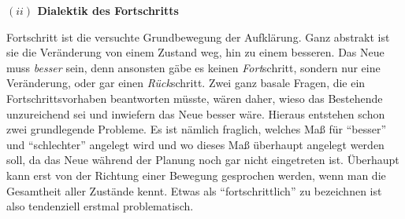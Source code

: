 \documentclass[a4paper, 12pt]{article}
\begin{document}
\begin{onehalfspace}
\vspace{5mm}
\noindent\textbf{$(ii)$ Dialektik des Fortschritts}

\noindent Fortschritt ist die versuchte Grundbewegung der Aufklärung. Ganz abstrakt ist sie die Veränderung von einem Zustand weg, hin zu einem besseren. Das Neue muss \emph{besser} sein, denn ansonsten gäbe es keinen \emph{Fort}schritt, sondern nur eine Veränderung, oder gar einen \emph{Rück}schritt. Zwei ganz basale Fragen, die ein Fortschrittsvorhaben beantworten müsste, wären daher, wieso das Bestehende unzureichend sei und inwiefern das Neue besser wäre. Hieraus entstehen schon zwei grundlegende Probleme. Es ist nämlich fraglich, welches Maß für "`besser"' und "`schlechter"' angelegt wird und wo dieses Maß überhaupt angelegt werden soll, da das Neue während der Planung noch gar nicht eingetreten ist. Überhaupt kann erst von der Richtung einer Bewegung gesprochen werden, wenn man die Gesamtheit aller Zustände kennt. Etwas als "`fortschrittlich"' zu bezeichnen ist also tendenziell erstmal problematisch. 


\end{onehalfspace}
\end{document}
